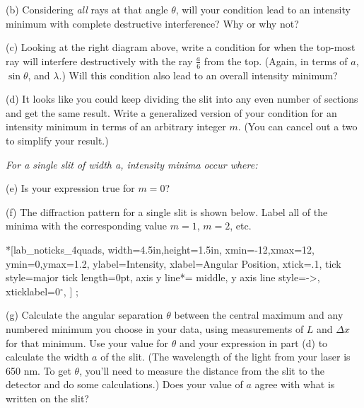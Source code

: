 (b) Considering \textit{all} rays at that angle $\theta$, will your condition lead to an intensity minimum with complete destructive interference?  Why or why not?
\answerspace{0.4in}

(c) Looking at the right diagram above, write a condition for when the top-most ray will interfere destructively with the ray $\frac{a}{6}$ from the top.  (Again, in terms of $a$, $\sin \theta$, and $\lambda$.)  Will this condition also lead to an overall intensity minimum?
\answerspace{0.4in}

(d) It looks like you could keep dividing the slit into any even number of sections and get the same result.  Write a generalized version of your condition for an intensity minimum in terms of an arbitrary integer $m$.  (You can cancel out a two to simplify your result.)

\answerspace{0.1in}
\hspace{0.8in}\textit{For a single slit of width \textit{a}, intensity \textit{minima} occur where: }
\answerspace{0.1in}

(e) Is your expression true for $m=0$?
\answerspace{0.4in}

(f) The diffraction pattern for a single slit is shown below.  Label all of the minima with the corresponding value $m=1$, $m=2$, etc.  
\label{fraunhofer_graph}

\begin{lab_axis}*[lab_noticks_4quads,
	width=4.5in,height=1.5in,
	xmin=-12,xmax=12,
	ymin=0,ymax=1.2,
	ylabel=Intensity,
	xlabel=Angular Position,
	xtick={.1}, %
	tick style={major tick length=0pt},
	axis y line*= {middle, y axis line style={->}}, %
	xticklabel={0$^\circ$},
]
;
\end{lab_axis}

\pagebreak[3]

(g) Calculate the angular separation $\theta$ between the central maximum and any numbered minimum you choose in your data, using measurements of $L$ and $\Delta x$ for that minimum.  Use your value for $\theta$ and your expression in part (d) to calculate the width $a$ of the slit.  (The wavelength of the light from your laser is 650 nm.  To get $\theta$, you'll need to measure the distance from the slit to the detector and do some calculations.)    Does your value of $a$ agree with what is written on the slit?
\answerspace{1.0in}


